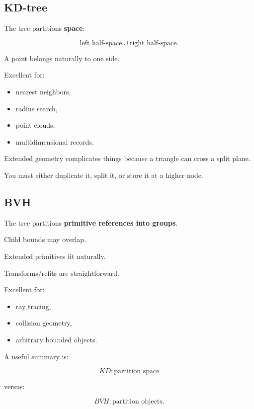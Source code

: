 \subsection{KD-tree}\label{06-engine-ii-ch029-kd-tree}

\hypertarget{06-engine-ii-ch029-kd-tree}{}

The tree partitions \textbf{space}:

\[
\text{left half-space}
\cup
\text{right half-space}.
\]

A point belongs naturally to one side.

Excellent for:

\begin{itemize}
\tightlist
\item
  nearest neighbors,
\item
  radius search,
\item
  point clouds,
\item
  multidimensional records.
\end{itemize}

Extended geometry complicates things because a triangle can cross a split plane.

You must either duplicate it, split it, or store it at a higher node.

\subsection{BVH}\label{06-engine-ii-ch029-bvh}

\hypertarget{06-engine-ii-ch029-bvh}{}

The tree partitions \textbf{primitive references into groups}.

Child bounds may overlap.

Extended primitives fit naturally.

Transforms/refits are straightforward.

Excellent for:

\begin{itemize}
\tightlist
\item
  ray tracing,
\item
  collision geometry,
\item
  arbitrary bounded objects.
\end{itemize}

A useful summary is:

\[
\boxed{
KD:
\text{partition space}
}
\]

versus:

\[
\boxed{
BVH:
\text{partition objects}.
}
\]

